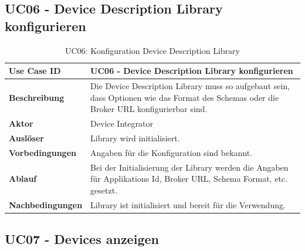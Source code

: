 \subsection{UC06 - Device Description Library konfigurieren}
\begin{table}[H]
\begin{tabularx}{\textwidth}{|l|X|}

 \hline
 {\bf Use Case ID }    & UC06 - Device Description Library konfigurieren \\  \hline
 {\bf Beschreibung }   & Die Device Description Library muss so aufgebaut sein, dass Optionen wie das Format des Schemas oder die Broker URL konfigurierbar sind.  \\ \hline
 {\bf Aktor }          & Device Integrator \\ \hline
 {\bf Auslöser }       & Library wird initialisiert. \\ \hline
 {\bf Vorbedingungen } & Angaben für die Konfiguration sind bekannt. \\ \hline
 {\bf Ablauf }         & Bei der Initialisierung der Library werden die Angaben für Applikations Id, Broker URL, Schema Format, etc. gesetzt. \\ \hline
 {\bf Nachbedingungen} & Library ist initialisiert und bereit für die Verwendung. \\ \hline
  
\end{tabularx}
\caption{UC06: Konfiguration Device Description Library}
\end{table}

\subsection{UC07 - Devices anzeigen}

